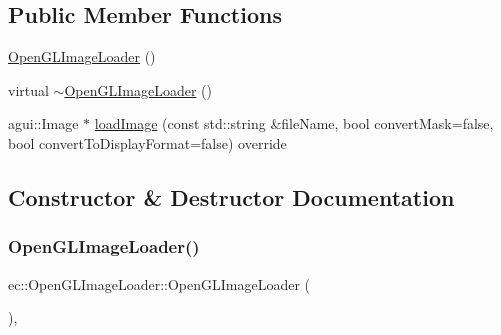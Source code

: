 \subsection*{Public Member Functions}
\begin{DoxyCompactItemize}
\item 
\mbox{\hyperlink{classec_1_1_open_g_l_image_loader_a8d5c1f40806fd1a3d09dcd62c8558fa0}{Open\+G\+L\+Image\+Loader}} ()
\item 
virtual \mbox{\hyperlink{classec_1_1_open_g_l_image_loader_ab393a1937b161abbb30055682973c13d}{$\sim$\+Open\+G\+L\+Image\+Loader}} ()
\item 
agui\+::\+Image $\ast$ \mbox{\hyperlink{classec_1_1_open_g_l_image_loader_a0e552f6d59a9fe5fd9208d7c664e67b7}{load\+Image}} (const std\+::string \&file\+Name, bool convert\+Mask=false, bool convert\+To\+Display\+Format=false) override
\end{DoxyCompactItemize}


\subsection{Constructor \& Destructor Documentation}
\mbox{\label{classec_1_1_open_g_l_image_loader_a8d5c1f40806fd1a3d09dcd62c8558fa0}} 
\subsubsection{\texorpdfstring{Open\+G\+L\+Image\+Loader()}{OpenGLImageLoader()}}
{\footnotesize\ttfamily ec\+::\+Open\+G\+L\+Image\+Loader\+::\+Open\+G\+L\+Image\+Loader (\begin{DoxyParamCaption}{ }\end{DoxyParamCaption})\hspace{0.3cm}{\ttfamily [explicit]}, {\ttfamily [default]}}

\mbox{\label{classec_1_1_open_g_l_image_loader_ab393a1937b161abbb30055682973c13d}} 
